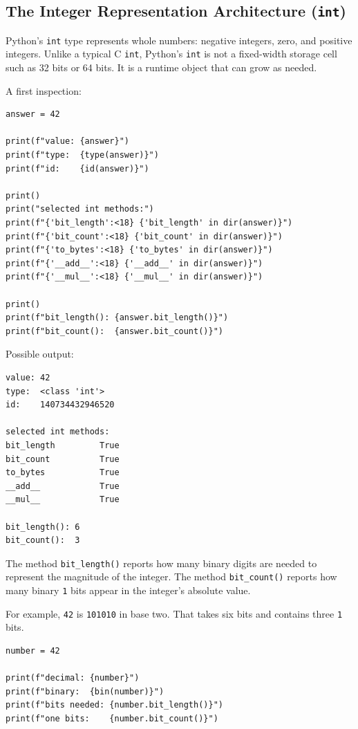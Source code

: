 \subsection{The Integer Representation Architecture (\texttt{int})}

Python's \texttt{int} type represents whole numbers: negative integers, zero, and positive integers. Unlike a typical C \texttt{int}, Python's \texttt{int} is not a fixed-width storage cell such as 32 bits or 64 bits. It is a runtime object that can grow as needed.

A first inspection:

\begin{verbatim}
answer = 42

print(f"value: {answer}")
print(f"type:  {type(answer)}")
print(f"id:    {id(answer)}")

print()
print("selected int methods:")
print(f"{'bit_length':<18} {'bit_length' in dir(answer)}")
print(f"{'bit_count':<18} {'bit_count' in dir(answer)}")
print(f"{'to_bytes':<18} {'to_bytes' in dir(answer)}")
print(f"{'__add__':<18} {'__add__' in dir(answer)}")
print(f"{'__mul__':<18} {'__mul__' in dir(answer)}")

print()
print(f"bit_length(): {answer.bit_length()}")
print(f"bit_count():  {answer.bit_count()}")
\end{verbatim}

Possible output:

\begin{verbatim}
value: 42
type:  <class 'int'>
id:    140734432946520

selected int methods:
bit_length         True
bit_count          True
to_bytes           True
__add__            True
__mul__            True

bit_length(): 6
bit_count():  3
\end{verbatim}

The method \texttt{bit\_length()} reports how many binary digits are needed to represent the magnitude of the integer. The method \texttt{bit\_count()} reports how many binary \texttt{1} bits appear in the integer's absolute value.

For example, \texttt{42} is \texttt{101010} in base two. That takes six bits and contains three \texttt{1} bits.

\begin{verbatim}
number = 42

print(f"decimal: {number}")
print(f"binary:  {bin(number)}")
print(f"bits needed: {number.bit_length()}")
print(f"one bits:    {number.bit_count()}")
\end{verbatim}

